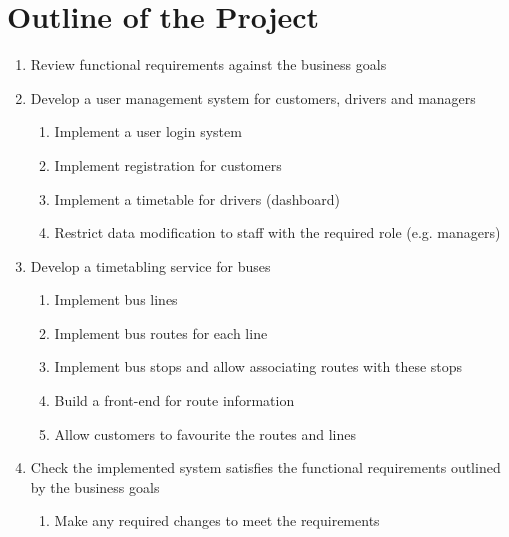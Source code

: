 \clearpage
\section{Outline of the Project}

\begin{enumerate}
  \item Review functional requirements against the business goals
  \item Develop a user management system for customers, drivers and managers
  \begin{enumerate}
    \item Implement a user login system
    \item Implement registration for customers
    \item Implement a timetable for drivers (dashboard)
    \item Restrict data modification to staff with the required role (e.g. managers)
  \end{enumerate}
  \item Develop a timetabling service for buses
  \begin{enumerate}
    \item Implement bus lines
    \item Implement bus routes for each line
    \item Implement bus stops and allow associating routes with these stops
    \item Build a front-end for route information
    \item Allow customers to favourite the routes and lines
  \end{enumerate}
  \item Check the implemented system satisfies the functional
  requirements outlined by the business goals
  \begin{enumerate}
    \item Make any required changes to meet the requirements
  \end{enumerate}
\end{enumerate}
